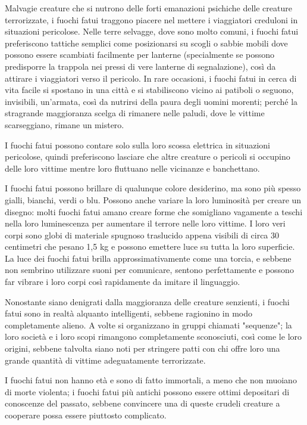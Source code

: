 \begin{multicols}{2}
Malvagie creature che si nutrono delle forti emanazioni psichiche delle creature terrorizzate, i fuochi fatui traggono piacere nel mettere i viaggiatori creduloni in situazioni pericolose. Nelle terre selvagge, dove sono molto comuni, i fuochi fatui preferiscono tattiche semplici come posizionarsi su scogli o sabbie mobili dove possono essere scambiati facilmente per lanterne (specialmente se possono predisporre la trappola nei pressi di vere lanterne di segnalazione), così da attirare i viaggiatori verso il pericolo. In rare occasioni, i fuochi fatui in cerca di vita facile si spostano in una città e si stabiliscono vicino ai patiboli o seguono, invisibili, un'armata, così da nutrirsi della paura degli uomini morenti; perché la stragrande maggioranza scelga di rimanere nelle paludi, dove le vittime scarseggiano, rimane un mistero.

I fuochi fatui possono contare solo sulla loro scossa elettrica in situazioni pericolose, quindi preferiscono lasciare che altre creature o pericoli si occupino delle loro vittime mentre loro fluttuano nelle vicinanze e banchettano.

I fuochi fatui possono brillare di qualunque colore desiderino, ma sono più spesso gialli, bianchi, verdi o blu. Possono anche variare la loro luminosità per creare un disegno: molti fuochi fatui amano creare forme che somigliano vagamente a teschi nella loro luminescenza per aumentare il terrore nelle loro vittime. I loro veri corpi sono globi di materiale spugnoso traslucido appena visibili di circa 30 centimetri che pesano 1,5 kg e possono emettere luce su tutta la loro superficie. La luce dei fuochi fatui brilla approssimativamente come una torcia, e sebbene non sembrino utilizzare suoni per comunicare, sentono perfettamente e possono far vibrare i loro corpi così rapidamente da imitare il linguaggio.

Nonostante siano denigrati dalla maggioranza delle creature senzienti, i fuochi fatui sono in realtà alquanto intelligenti, sebbene ragionino in modo completamente alieno. A volte si organizzano in gruppi chiamati "sequenze"; la loro società e i loro scopi rimangono completamente sconosciuti, così come le loro origini, sebbene talvolta siano noti per stringere patti con chi offre loro una grande quantità di vittime adeguatamente terrorizzate.

I fuochi fatui non hanno età e sono di fatto immortali, a meno che non muoiano di morte violenta; i fuochi fatui più antichi possono essere ottimi depositari di conoscenze del passato, sebbene convincere una di queste crudeli creature a cooperare possa essere piuttosto complicato.



\end{multicols}
